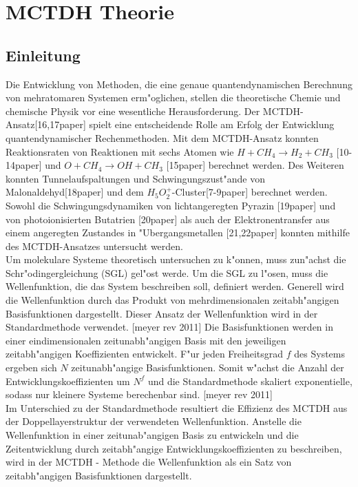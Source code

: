 \chapter{MCTDH Theorie}

\section{Einleitung}
Die Entwicklung von Methoden, die eine genaue quantendynamischen Berechnung von mehratomaren Systemen erm"oglichen, stellen die theoretische Chemie und
chemische Physik vor eine wesentliche Herausforderung.
Der MCTDH-Ansatz[16,17paper] spielt eine entscheidende Rolle am Erfolg der Entwicklung quantendynamischer Rechenmethoden.
Mit dem MCTDH-Ansatz konnten Reaktionsraten von Reaktionen mit sechs Atomen wie $H+CH_{4} \rightarrow H_{2} + CH_{3}$ [10-14paper]
und $ O + CH_{4} \rightarrow OH + CH_{3} $ [15paper] berechnet werden.
Des Weiteren konnten Tunnelaufspaltungen und Schwingungszust"ande von Malonaldehyd[18paper] und dem $ H_{5}O^{+}_{2} $-Cluster[7-9paper] berechnet werden.
Sowohl die Schwingungsdynamiken von lichtangeregten Pyrazin [19paper] und von photoionisierten Butatrien [20paper] als auch der Elektronentransfer
aus einem angeregten Zustandes in "Ubergangsmetallen [21,22paper]  konnten mithilfe des MCTDH-Ansatzes untersucht werden.
\\Um molekulare Systeme theoretisch untersuchen zu k"onnen, muss zun"achst die Schr"odingergleichung (SGL) gel"ost werde.
Um die SGL zu l"osen, muss die Wellenfunktion, die das System beschreiben soll, definiert werden.
Generell wird die Wellenfunktion durch das Produkt von mehrdimensionalen zeitabh"angigen Basisfunktionen dargestellt.
Dieser Ansatz der Wellenfunktion wird in der Standardmethode verwendet. [meyer rev 2011]
 Die Basisfunktionen werden in einer eindimensionalen zeitunabh"angigen Basis mit den jeweiligen zeitabh"angigen Koeffizienten entwickelt.
F"ur jeden Freiheitsgrad $f$ des Systems ergeben sich $N$ zeitunabh"angige Basisfunktionen. Somit w"achst die Anzahl der Entwicklungskoeffizienten um $N^{f}$ und
die Standardmethode skaliert exponentielle, sodass nur kleinere Systeme berechenbar sind. [meyer rev 2011]
  \\ Im Unterschied zu der Standardmethode resultiert die Effizienz des MCTDH aus der Doppellayerstruktur der verwendeten Wellenfunktion.
Anstelle die Wellenfunktion in einer zeitunab"angigen Basis zu entwickeln und die Zeitentwicklung durch zeitabh"angige Entwicklungskoeffizienten zu beschreiben,
wird in der MCTDH - Methode die Wellenfunktion als ein Satz von zeitabh"angigen Basisfunktionen dargestellt.

